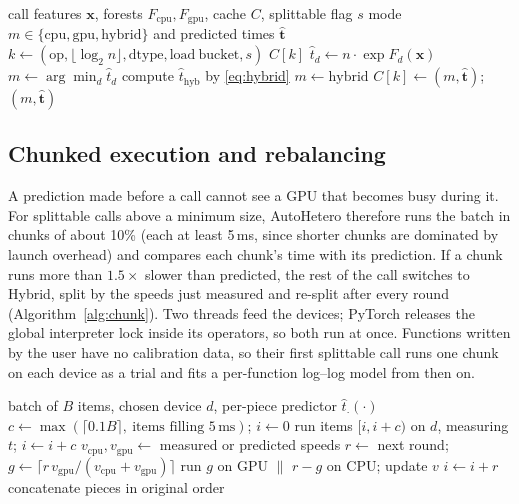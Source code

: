 \documentclass[conference]{IEEEtran}
\begin{document}
\begin{algorithm}[t]
\caption{Per-call device decision in AutoHetero}
\label{alg:decide}
\begin{algorithmic}[1]
\Require call features $\mathbf{x}$, forests $F_{\mathrm{cpu}}, F_{\mathrm{gpu}}$, cache $C$, splittable flag $s$
\Ensure mode $m \in \{\mathrm{cpu}, \mathrm{gpu}, \mathrm{hybrid}\}$ and predicted times $\hat{\mathbf{t}}$
\State $k \gets (\mathrm{op}, \lfloor\log_2 n\rfloor, \mathrm{dtype}, \mathrm{load\ bucket}, s)$
 \State \Return $C[k]$ 
\EndIf
{}
  \State $\hat t_d \gets n \cdot \exp F_d(\mathbf{x})$ 
\EndFor
\State $m \gets \arg\min_d \hat t_d$
  \State compute $\hat t_{\mathrm{hyb}}$ by \eqref{eq:hybrid}
   $m \gets \mathrm{hybrid}$ \EndIf
\EndIf
\State $C[k] \gets (m, \hat{\mathbf{t}})$; \Return $(m, \hat{\mathbf{t}})$
\end{algorithmic}
\end{algorithm}

\subsection{Chunked execution and rebalancing}

A prediction made before a call cannot see a GPU that becomes busy during it. For splittable calls above a minimum size, AutoHetero therefore runs the batch in chunks of about 10\% (each at least 5\,ms, since shorter chunks are dominated by launch overhead) and compares each chunk's time with its prediction. If a chunk runs more than $1.5\times$ slower than predicted, the rest of the call switches to Hybrid, split by the speeds just measured and re-split after every round (Algorithm~\ref{alg:chunk}). Two threads feed the devices; PyTorch releases the global interpreter lock inside its operators, so both run at once. Functions written by the user have no calibration data, so their first splittable call runs one chunk on each device as a trial and fits a per-function log--log model from then on.

\begin{algorithm}[t]
\caption{Chunked execution with slowdown-triggered rebalance}
\label{alg:chunk}
\begin{algorithmic}[1]
\Require batch of $B$ items, chosen device $d$, per-piece predictor $\hat t_\cdot(\cdot)$
\State $c \gets \max(\lceil 0.1B\rceil,\ \text{items filling } 5\,\mathrm{ms})$; $i \gets 0$
  \State run items $[i, i{+}c)$ on $d$, measuring $t$; $i \gets i + c$
    \State $v_{\mathrm{cpu}}, v_{\mathrm{gpu}} \gets$ measured or predicted speeds
     
      \State $r \gets$ next round; $g \gets \lceil r\,v_{\mathrm{gpu}}/(v_{\mathrm{cpu}}+v_{\mathrm{gpu}})\rceil$
      \State run $g$ on GPU $\parallel$ $r{-}g$ on CPU; update $v$
      \State $i \gets i + r$
    \EndWhile
  \EndIf
\EndWhile
\State concatenate pieces in original order
\end{algorithmic}
\end{algorithm}
\end{document}
